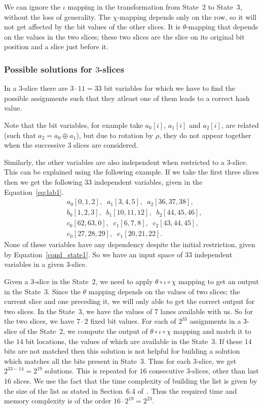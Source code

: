 \documentclass[runningheads]{llncs}
\begin{document}
We can ignore the $\iota$ mapping in the transformation from State~2 to State~3, without the loss of generality. The $\chi$-mapping depends only on the row, so it will not get affected by the bit values of the other slices. It is $\theta$-mapping that depends on the values in the two slices; these two slices are the slice on its original bit position and a slice just before it.

\subsubsection{Possible solutions for $3$-slices} 
In a $3$-slice there are $3 \cdot 11 = 33$ bit variables for which we have to find the possible assignments such that they atleast one of them leads to a correct hash value. 

Note that the bit variables, for example take $a_0[i]$, $a_1[i]$ and $a_2[i]$, are related (such that $a_2 = a_0 \oplus a_1$), but due to rotation by $\rho$, they do not appear together when the successive $3$ slices are considered.

Similarly, the other variables are also independent when restricted to a $3$-slice.
This can be explained using the following example. If we take the first three slices then we get the following $33$ independent variables, given in the Equation~\ref{eq:lab1}.
\begin{equation}
\label{eq:lab1}
\begin{aligned}
&a_0[0,1,2],\;\;a_1[3,4,5],\;\;a_2[36,37,38],\\
&b_0[1,2,3],\;\; b_1[10,11,12],\;\;b_2[44,45,46],\\
&c_0[62,63,0],\;\;c_1[6,7,8],\;\;c_2[43,44,45],\\
&e_0[27,28,29],\;\; e_1[20,21,22].
\end{aligned}
\end{equation}
None of these variables have any dependency despite the initial restriction, given by Equation~\ref{cond_state1}. So we have an input space of $33$ independent variables in a given $3$-slice. 

Given a $3$-slice in the State~2, we need to apply $\theta \circ \iota \circ \chi$ mapping to get an output in the State~3. Since the $\theta$ mapping depends on the values of two slices; the current slice and one preceding it, we will only able to get the correct output for two slices. In the State~3, we have the values of $7$ lanes available with us. So for the two slices, we have $7\cdot 2$ fixed bit values.
For each of $2^{33}$ assignments in a $3$-slice of the State~2, we compute the output of
$\theta \circ \iota \circ \chi$ mapping and match it to the $14$ bit locations, the values of which are available in the State~3. If these $14$ bits are not matched then this solution is not helpful for building a solution which matches all the bits present in State~3.
Thus for each $3$-slice, we get $2^{33-14} = 2^{19}$ solutions. This is repeated for $16$ consecutive $3$-slices, other than last $16$ slices. We use the fact that the time complexity of building the list is given by the size of the list as stated in Section~6.4 of~\cite{naya2011practical}. Thus the required time and memory complexity is of the order $16 \cdot 2^{19} = 2^{23}$.
\end{document}
